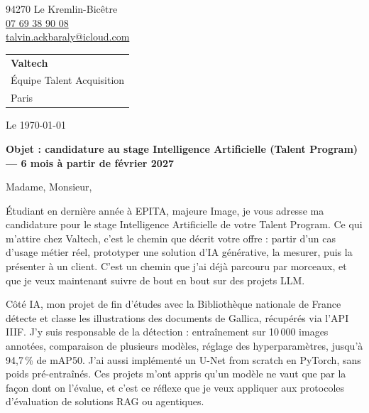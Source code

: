 \documentclass[11pt, a4paper]{extarticle}
\begin{document}
{\color{accent}\fontsize{22}{26}\selectfont\scshape{}}\par\vspace{3pt}
{\setlength{\parskip}{0pt}
94270 Le Kremlin-Bicêtre\\
\href{tel:+33769389008}{\textcolor{ink}{07 69 38 90 08}}\\
\href{mailto:talvin.ackbaraly@icloud.com}{\textcolor{ink}{talvin.ackbaraly@icloud.com}}\par}
\vspace{-4pt}{\color{hair}\rule{\textwidth}{0.4pt}}\par

\vspace{2pt}
\hfill\begin{tabular}[t]{@{}l@{}}
  \textbf{Valtech}\\
  Équipe Talent Acquisition\\
  Paris
\end{tabular}

Le \today

\vspace{2pt}
\textbf{Objet : candidature au stage Intelligence Artificielle (Talent Program) — 6 mois à partir
de février 2027}

\vspace{2pt}
Madame, Monsieur,

\justifying
Étudiant en dernière année à EPITA, majeure Image, je vous adresse ma candidature pour le stage
Intelligence Artificielle de votre Talent Program. Ce qui m'attire chez Valtech, c'est le chemin
que décrit votre offre : partir d'un cas d'usage métier réel, prototyper une solution d'IA
générative, la mesurer, puis la présenter à un client. C'est un chemin que j'ai déjà parcouru
par morceaux, et que je veux maintenant suivre de bout en bout sur des projets LLM.

Côté IA, mon projet de fin d'études avec la Bibliothèque nationale de France détecte et classe les
illustrations des documents de Gallica, récupérés via l'API IIIF. J'y suis responsable de la
détection : entraînement sur 10\,000 images annotées, comparaison de plusieurs modèles, réglage des
hyperparamètres, jusqu'à 94,7\,\% de mAP50. J'ai aussi implémenté un U-Net from scratch en
PyTorch, sans poids pré-entraînés. Ces projets m'ont appris qu'un modèle ne vaut que par la façon
dont on l'évalue, et c'est ce réflexe que je veux appliquer aux protocoles d'évaluation de
solutions RAG ou agentiques.
\end{document}
